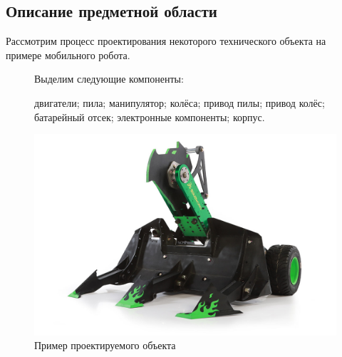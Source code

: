 ﻿%
\subsection{Описание предметной области}
\begin{frame}%

Рассмотрим процесс проектирования некоторого технического объекта на примере мобильного робота.
\begin{figure}[!ht]
  \begin{minipage}{0.455\linewidth}
    Выделим следующие компоненты:
    \begin{itemize}
      \arrowitem двигатели;
      \arrowitem пила;
      \arrowitem манипулятор;
      \arrowitem колёса;
      \arrowitem привод пилы;
      \arrowitem привод колёс;
      \arrowitem батарейный отсек;
      \arrowitem электронные компоненты;
      \arrowitem корпус.
    \end{itemize}
  \end{minipage}%
  \begin{minipage}{0.455\linewidth}
    \centering
    \includegraphics[width=\textwidth]{images/robot.jpg}
    \caption{Пример проектируемого объекта}
    \label{fig:technicalObjectExample}
  \end{minipage}
\end{figure}


\end{frame}
